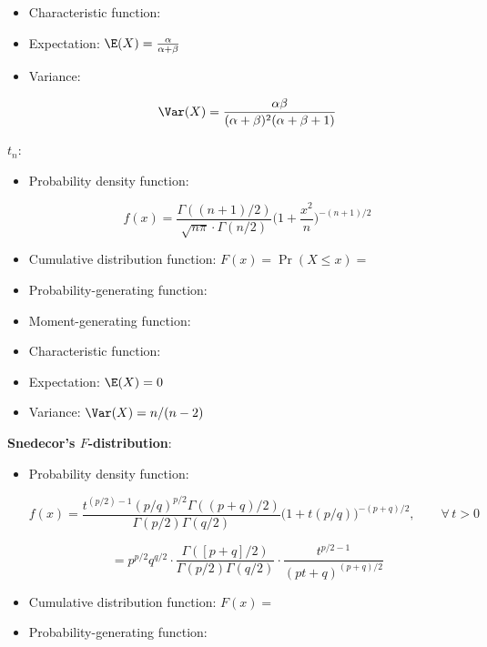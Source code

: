 \begin{itemize}
\begin{itemize}
\item Characteristic function:

\item Expectation: \(\E(X) = \frac{\alpha}{\alpha + \beta} \)

\item Variance: 

\[
\Var(X) = \frac{\alpha \beta}{(\alpha + \beta)^2(\alpha + \beta + 1)} 
\]

\end{itemize}

\textbf{\(t_n\)}:

\begin{itemize}

\item Probability density function: 

\[
f(x)  = \frac{\Gamma((n+1)/2)}{\sqrt{n \pi} \cdot \Gamma(n/2)} \bigg( 1 + \frac{x^2}{n} \bigg)^{-(n+1)/2}
\]

\item Cumulative distribution function: \(F(x) = \Pr(X \leq x) = \)

\item Probability-generating function: 

\item Moment-generating function:

\item Characteristic function:

\item Expectation: \(\E(X) = 0  \)

\item Variance: \(\Var(X) = n/(n-2)\)

\end{itemize}

\textbf{Snedecor's \(F\)-distribution}: 

\begin{itemize}

\item Probability density function: 

\[
f(x) =  \frac{t^{(p/2)-1}(p/q)^{p/2}\Gamma((p+q)/2)}{\Gamma(p/2)\Gamma(q/2)}\Big(1+t(p/q)\Big)^{-(p+q)/2},\qquad\forall\,t>0
\]

\[
= p^{p/2} q^{q/2}  \cdot  \frac{\Gamma([p+q]/2)  }{\Gamma(p/2)\Gamma(q/2) } \cdot  \frac{t^{p/2-1} }{  (pt+q)^{(p+q)/2} }
\]

\item Cumulative distribution function: \(F(x) =\)

\item Probability-generating function:


\end{itemize}
\end{itemize}
